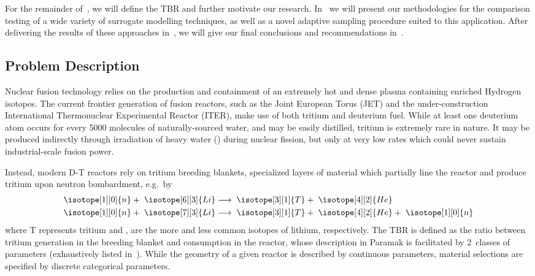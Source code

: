 For the remainder of~, we will define the TBR and further motivate our
research. In~ we will present our methodologies for the comparison
testing of a wide variety of surrogate modelling techniques, as well as a novel
adaptive sampling procedure suited to this application. After delivering the
results of these approaches in~, we will give our final conclusions and
recommendations in~.


\subsection{Problem Description}
\label{sec:problemdescription}

Nuclear fusion technology relies on the production and containment of an
extremely hot and dense plasma containing enriched Hydrogen isotopes. The current frontier generation of fusion reactors, such as the Joint European Torus (JET) and the
under-construction International Thermonuclear Experimental Reactor (ITER), make
use of both tritium and deuterium fuel. While at least one deuterium atom occurs for every \num{5000} molecules of naturally-sourced water, and may be easily distilled, tritium is extremely rare in nature. It may be produced indirectly through irradiation of heavy water
(\DDO) during nuclear fission, but only at very low rates which could
never sustain industrial-scale fusion power.

Instead, modern D-T reactors rely on tritium breeding blankets, specialized
layers of material which partially line the reactor and produce tritium upon
neutron bombardment, e.g.~by 
\begin{eqnarray}
	\isotope[1][0]{n} + \hspace{3pt} \isotope[6][3]{Li} 
	&\longrightarrow \hspace{3pt} 
	\isotope[3][1]{T} + \hspace{3pt}\isotope[4][2]{He} \\
	\isotope[1][0]{n} + \hspace{3pt} \isotope[7][3]{Li} 
	&\longrightarrow \hspace{3pt} 
	\isotope[3][1]{T} + \hspace{3pt} \isotope[4][2]{He} + \hspace{3pt} \isotope[1][0]{n}
\end{eqnarray}%
where T represents tritium and ,  are the more and
less common isotopes of lithium, respectively. The TBR is defined as the ratio
between tritium generation in the breeding blanket and consumption in the
reactor, whose description in Paramak is facilitated by 2~classes of parameters
(exhaustively listed in~). While the geometry of a given
reactor is described by continuous parameters, material selections are specified
by discrete categorical parameters.

